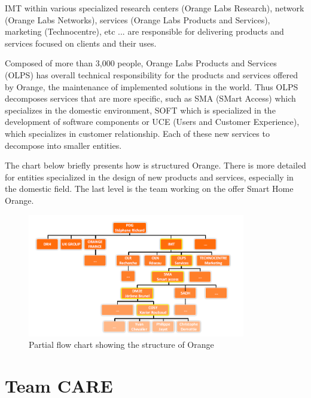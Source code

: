 IMT within various specialized research centers (Orange Labs Research), network (Orange Labs Networks), services (Orange Labs Products and Services), marketing (Technocentre), etc ... are responsible for delivering products and services focused on clients and their uses.

Composed of more than 3,000 people, Orange Labs Products and Services (OLPS) has overall technical responsibility for the products and services offered by Orange, the maintenance of implemented solutions in the world. Thus OLPS decomposes services that are more specific, such as SMA (SMart Access) which specializes in the domestic environment, SOFT which is specialized in the development of software components or UCE (Users and Customer Experience), which specializes in customer relationship. Each of these new services to decompose into smaller entities.

The chart below briefly presents how is structured Orange. There is more detailed for entities specialized in the design of new products and services, especially in the domestic field. The last level is the team working on the offer Smart Home Orange.

\begin{figure}[htbp]
	\centering
		\includegraphics[width=9.5cm]{Figures/structureorange.png}
	\caption[Partial flow chart showing the structure of Orange]{Partial flow chart showing the structure of Orange}
	\label{fig:structure}
\end{figure}
\section{Team CARE}

